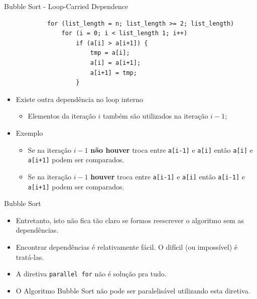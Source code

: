 	\begin{frame}[fragile]{Bubble Sort - Loop-Carried Dependence}
		\begin{verbatim}
			for (list_length = n; list_length >= 2; list_length) 
				for (i = 0; i < list_length 1; i++)
					if (a[i] > a[i+1]) { 
						tmp = a[i];
						a[i] = a[i+1];
						a[i+1] = tmp;
					}
		\end{verbatim}
		\begin{itemize}
			\item Existe outra dependência no loop interno
			\begin{itemize}
				\item Elementos da iteração $i$ também são utilizados na iteração $i-1$;
			\end{itemize}
			\item Exemplo
			\begin{itemize}
				\item Se na iteração $i-1$ \textbf{não houver} troca entre {\tt a[i-1]} e {\tt a[i]} então {\tt a[i]} e {\tt a[i+1]} podem ser comparados.
				\item Se na iteração $i-1$ \textbf{houver} troca entre {\tt a[i-1]} e {\tt a[i]} então {\tt a[i-1]} e {\tt a[i+1]} podem ser comparados.
			\end{itemize}
		\end{itemize}
\end{frame}

			
	\begin{frame}{Bubble Sort}
		\begin{itemize}
			\item Entretanto, isto não fica tão claro se formos reescrever o algoritmo sem as dependências.
			\item Encontrar dependências é relativamente fácil. O difícil (ou impossível) é tratá-las.
			\item A diretiva {\tt parallel for} não é solução pra tudo.
			\item O Algoritmo Bubble Sort não pode ser paralelisável utilizando esta diretiva.
		\end{itemize}
	\end{frame}










